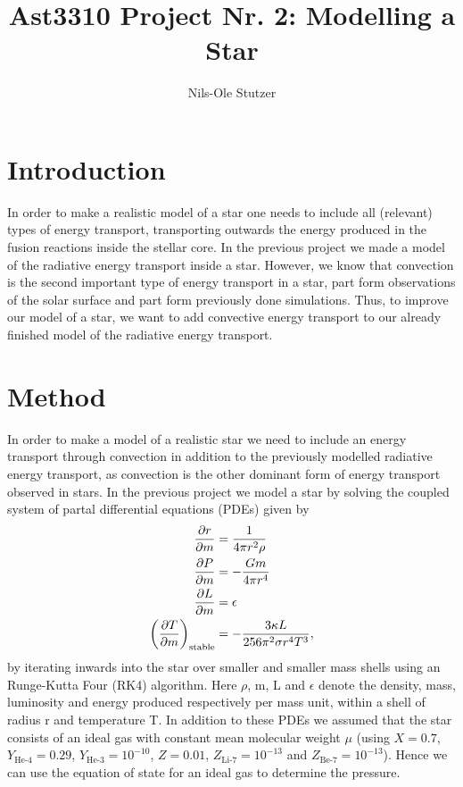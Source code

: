 \documentclass{emulateapj}
\begin{document}
	
	\title{Ast3310 Project Nr. 2: Modelling a Star}
	
	\author{Nils-Ole Stutzer}
	
	
	\section*{Introduction}
	In order to make a realistic model of a star one needs to include all (relevant) types of energy transport, transporting outwards the energy produced in the fusion reactions inside the stellar core. In the previous project we made a model of the radiative energy transport inside a star. However, we know that convection is the second important type of energy transport in a star, part form observations of the solar surface and part form previously done simulations. Thus, to improve our model of a star, we want to add convective energy transport to our already finished model of the radiative energy transport. 
	
	\section*{Method}
	In order to make a model of a realistic star we need to include an energy transport through convection in addition to the previously modelled radiative energy transport, as convection is the other dominant form of energy transport observed in stars. In the previous project we model a star by solving the coupled system of partal differential equations (PDEs) given by
	\begin{align}
		\pdv{r}{m} &= \frac{1}{4\pi r^2\rho}\\
		\pdv{P}{m} &= -\frac{Gm}{4\pi r^4}\\
		\pdv{L}{m} &= \epsilon\\
		\left(\pdv{T}{m}\right)_\text{stable} &= -\frac{3\kappa L}{256\pi^2\sigma r^4 T^3},
		\label{eq:proj1} 
	\end{align}
	by iterating inwards into the star over smaller and smaller mass shells using an Runge-Kutta Four (RK4) algorithm. Here $\rho$, m, L and $\epsilon$ denote the density, mass, luminosity
	and energy produced respectively per mass unit, within a shell of radius r and temperature T. In addition to these PDEs we assumed that the star consists of an ideal gas with constant mean molecular weight $\mu$ (using $X = 0.7$, $Y_\text{He-4} = 0.29$, $Y_\text{He-3} = 10^{-10}$, $Z = 0.01$, $Z_\text{Li-7} = 10^{-13}$ and $Z_\text{Be-7} = 10^{-13}$). Hence we can use the equation of state for an ideal gas to determine the pressure.
	
\end{document}
